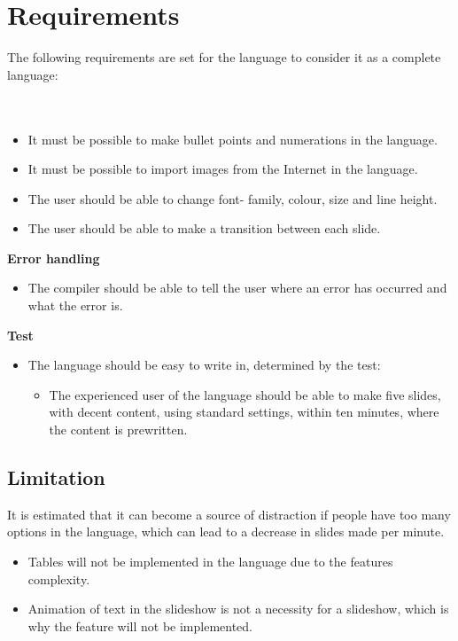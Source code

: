 \section{Requirements}
\label{LanguageRequirements}
The following requirements are set for the language to consider it as a complete language:
\\ \\
 \\
\begin{itemize}
\item It must be possible to make bullet points and numerations in the language.
\item It must be possible to import images from the Internet in the language.
\item The user should be able to change font- family, colour, size and line height.
\item The user should be able to make a transition between each slide.
\end{itemize}
\textbf{Error handling}\\
\begin{itemize}
\item The compiler should be able to tell the user where an error has occurred and what the error is.
\end{itemize}
\textbf{Test}\\
\begin{itemize}
\item The language should be easy to write in, determined by the test:
\begin{itemize}
\item The experienced user of the language should be able to make five slides, with decent content, using standard settings, within ten minutes, where the content is prewritten.
\end{itemize}
\end{itemize}

\subsection*{Limitation}
It is estimated that it can become a source of distraction if people have too many options in the language, which can lead to a decrease in slides made per minute.
\begin{itemize}
	\item Tables will not be implemented in the language due to the features complexity.
	\item Animation of text in the slideshow is not a necessity for a slideshow, which is why the feature will not be implemented.
\end{itemize}
